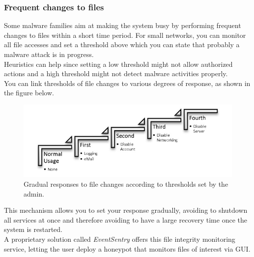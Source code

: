\subsubsection{Frequent changes to files}
Some malware families aim at making the system busy by performing frequent changes to files within a short time period. For small networks, you can monitor all file accesses and set a threshold above which you can state that probably a malware attack is in progress. \\
Heuristics can help since setting a low threshold might not allow authorized actions and a high threshold might not detect malware activities properly.\\
You can link thresholds of file changes to various degrees of response, as shown in the figure below.

\begin{figure}[ht!]
  \centering
  \includegraphics[width = 14cm]{images/responses.jpg}
  \caption{ Gradual responses to file changes according to thresholds set by the admin.}
  \label{fig:irradiances}
\end{figure}
\FloatBarrier

\noindent This mechanism allows you to set your response gradually, avoiding to shutdown all services at once and therefore avoiding to have a large recovery time once the system is restarted.\\
A proprietary solution called \textit{EventSentry} offers this file integrity monitoring service, letting the user deploy a honeypot that monitors files of interest via GUI.

